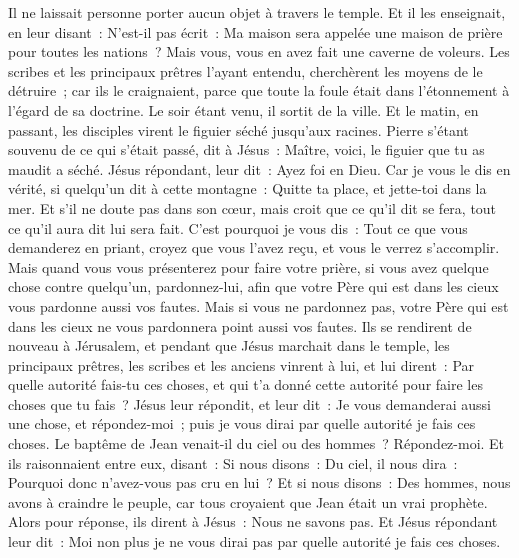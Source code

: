 \begin{multicols}{2}
Il ne laissait personne porter aucun objet à travers le temple.
Et il les enseignait, en leur disant~: N'est-il pas écrit~: Ma maison sera appelée une maison de prière pour toutes les nations~? Mais vous, vous en avez fait une caverne de voleurs.
Les scribes et les principaux prêtres l'ayant entendu, cherchèrent les moyens de le détruire~; car ils le craignaient, parce que toute la foule était dans l'étonnement à l’égard de sa doctrine.
Le soir étant venu, il sortit de la ville.
Et le matin, en passant, les disciples virent le figuier séché jusqu'aux racines.
Pierre s'étant souvenu de ce qui s'était passé, dit à Jésus~: Maître, voici, le figuier que tu as maudit a séché.
Jésus répondant, leur dit~: Ayez foi en Dieu.
Car je vous le dis en vérité, si quelqu'un dit à cette montagne~: Quitte ta place, et jette-toi dans la mer. Et s'il ne doute pas dans son cœur, mais croit que ce qu'il dit se fera, tout ce qu'il aura dit lui sera fait.
C'est pourquoi je vous dis~: Tout ce que vous demanderez en priant, croyez que vous l'avez reçu, et vous le verrez s'accomplir.
Mais quand vous vous présenterez pour faire votre prière, si vous avez quelque chose contre quelqu'un, pardonnez-lui, afin que votre Père qui est dans les cieux vous pardonne aussi vos fautes.
Mais si vous ne pardonnez pas, votre Père qui est dans les cieux ne vous pardonnera point aussi vos fautes.
Ils se rendirent de nouveau à Jérusalem, et pendant que Jésus marchait dans le temple, les principaux prêtres, les scribes et les anciens vinrent à lui,
et lui dirent~: Par quelle autorité fais-tu ces choses, et qui t'a donné cette autorité pour faire les choses que tu fais~?
Jésus leur répondit, et leur dit~: Je vous demanderai aussi une chose, et répondez-moi~; puis je vous dirai par quelle autorité je fais ces choses.
Le baptême de Jean venait-il du ciel ou des hommes~? Répondez-moi.
Et ils raisonnaient entre eux, disant~: Si nous disons~: Du ciel, il nous dira~: Pourquoi donc n'avez-vous pas cru en lui~?
Et si nous disons~: Des hommes, nous avons à craindre le peuple, car tous croyaient que Jean était un vrai prophète.
Alors pour réponse, ils dirent à Jésus~: Nous ne savons pas. Et Jésus répondant leur dit~: Moi non plus je ne vous dirai pas par quelle autorité je fais ces choses.

\end{multicols}
